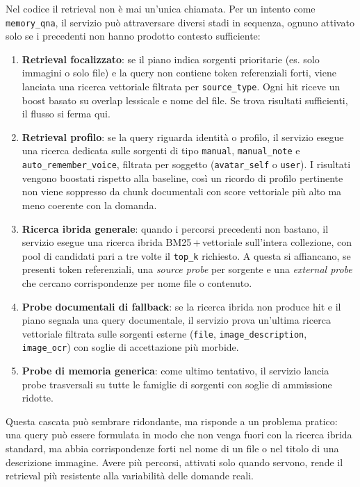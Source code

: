 Nel codice il retrieval non è mai un'unica chiamata. Per un intento come \texttt{memory\_qna}, il servizio può attraversare diversi stadi in sequenza, ognuno attivato solo se i precedenti non hanno prodotto contesto sufficiente:
\begin{enumerate}
\item \textbf{Retrieval focalizzato}: se il piano indica sorgenti prioritarie (es. solo immagini o solo file) e la query non contiene token referenziali forti, viene lanciata una ricerca vettoriale filtrata per \texttt{source\_type}. Ogni hit riceve un boost basato su overlap lessicale e nome del file. Se trova risultati sufficienti, il flusso si ferma qui.
\item \textbf{Retrieval profilo}: se la query riguarda identità o profilo, il servizio esegue una ricerca dedicata sulle sorgenti di tipo \texttt{manual}, \texttt{manual\_note} e \texttt{auto\_remember\_voice}, filtrata per soggetto (\texttt{avatar\_self} o \texttt{user}). I risultati vengono boostati rispetto alla baseline, così un ricordo di profilo pertinente non viene soppresso da chunk documentali con score vettoriale più alto ma meno coerente con la domanda.
\item \textbf{Ricerca ibrida generale}: quando i percorsi precedenti non bastano, il servizio esegue una ricerca ibrida BM25\,+\,vettoriale sull'intera collezione, con pool di candidati pari a tre volte il \texttt{top\_k} richiesto. A questa si affiancano, se presenti token referenziali, una \emph{source probe} per sorgente e una \emph{external probe} che cercano corrispondenze per nome file o contenuto.
\item \textbf{Probe documentali di fallback}: se la ricerca ibrida non produce hit e il piano segnala una query documentale, il servizio prova un'ultima ricerca vettoriale filtrata sulle sorgenti esterne (\texttt{file}, \texttt{image\_description}, \texttt{image\_ocr}) con soglie di accettazione più morbide.
\item \textbf{Probe di memoria generica}: come ultimo tentativo, il servizio lancia probe trasversali su tutte le famiglie di sorgenti con soglie di ammissione ridotte.
\end{enumerate}
Questa cascata può sembrare ridondante, ma risponde a un problema pratico: una query può essere formulata in modo che non venga fuori con la ricerca ibrida standard, ma abbia corrispondenze forti nel nome di un file o nel titolo di una descrizione immagine. Avere più percorsi, attivati solo quando servono, rende il retrieval più resistente alla variabilità delle domande reali.

